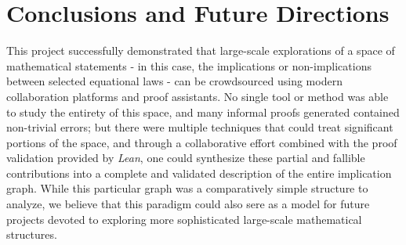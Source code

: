 \section{Conclusions and Future Directions}

This project successfully demonstrated that large-scale explorations of a space of mathematical statements - in this case, the implications or non-implications between selected equational laws - can be crowdsourced using modern collaboration platforms and proof assistants.  No single tool or method was able to study the entirety of this space, and many informal proofs generated contained non-trivial errors; but there were multiple techniques that could treat significant portions of the space, and through a collaborative effort combined with the proof validation provided by \emph{Lean}, one could synthesize these partial and fallible contributions into a complete and validated description of the entire implication graph.  While this particular graph was a comparatively simple structure to analyze, we believe that this paradigm could also sere as a model for future projects devoted to exploring more sophisticated large-scale mathematical structures.


